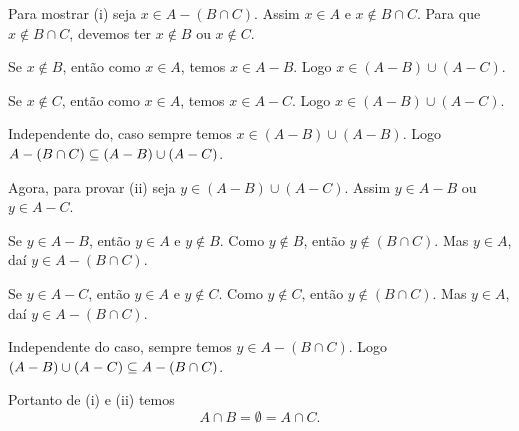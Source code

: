 \documentclass[12pt]{exam}
\begin{document}
    Para mostrar (i) seja $x \in A - (B \cap C)$. Assim $x \in A$ e $x \notin B \cap C$. Para que $x \notin B \cap C$, devemos ter $x \notin B$ ou $x \notin C$.

    Se $x \notin B$, então como $x \in A$, temos $x \in A - B$. Logo $x \in (A - B) \cup (A - C)$.

    Se $x \notin C$, então como $x \in A$, temos $x \in A - C$. Logo $x \in (A - B) \cup (A - C)$.

    Independente do, caso sempre temos  $x \in (A - B) \cup (A - B)$. Logo $A - (B \cap C) \subseteq (A - B) \cup (A - C)$.

    Agora, para provar (ii) seja $y \in (A - B) \cup (A - C)$. Assim $y \in A - B$ ou $y \in A - C$.

    Se $y \in A - B$, então $y \in A$ e $y \notin B$. Como $y \notin B$, então $y \notin (B \cap C)$. Mas $y \in A$, daí $y \in A - (B \cap C)$.

    Se $y \in A - C$, então $y \in A$ e $y \notin C$. Como $y \notin C$, então $y \notin (B \cap C)$. Mas $y \in A$, daí $y \in A - (B \cap C)$.

    Independente do caso, sempre temos $y \in A - (B \cap C)$. Logo $(A - B) \cup (A - C) \subseteq A - (B \cap C)$.

    Portanto de (i) e (ii) temos
    \[
        A \cap B = \emptyset = A \cap C.
    \]
\end{document}

